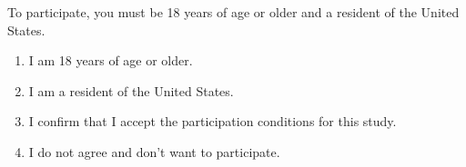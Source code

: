\begin{enumerate}
        To participate, you must be 18 years of age or older and a resident of the United States.
    \begin{enumerate}
        \item I am 18 years of age or older.  
        \item I am a resident of the United States.  
        \item I confirm that I accept the participation conditions for this study.  
        \item I do not agree and don't want to participate.  
    \end{enumerate}
    \setcounter{qcounter}{\value{enumi}}
\end{enumerate}

